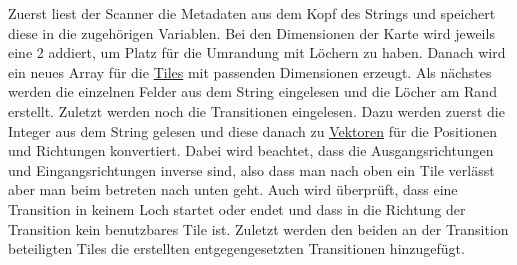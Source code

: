 Zuerst liest der Scanner die Metadaten aus dem Kopf des Strings und speichert diese in die zugehörigen Variablen. Bei den Dimensionen der Karte wird jeweils eine 2 addiert, um Platz für die Umrandung mit Löchern zu haben. Danach wird ein neues Array für die \hyperref[subsec:Tile]{Tiles} mit passenden Dimensionen erzeugt. Als nächstes werden die einzelnen Felder aus dem String eingelesen und die Löcher am Rand erstellt. Zuletzt werden noch die Transitionen eingelesen. Dazu werden zuerst die Integer aus dem String gelesen und diese danach zu \hyperref[subsec:Vector2i]{Vektoren} für die Positionen und Richtungen konvertiert. Dabei wird beachtet, dass die Ausgangsrichtungen und Eingangsrichtungen inverse sind, also dass man nach oben ein Tile verlässt aber man beim betreten nach unten geht. Auch wird überprüft, dass eine Transition in keinem Loch startet oder endet und dass in die Richtung der Transition kein benutzbares Tile ist. Zuletzt werden den beiden an der Transition beteiligten Tiles die erstellten entgegengesetzten Transitionen hinzugefügt.